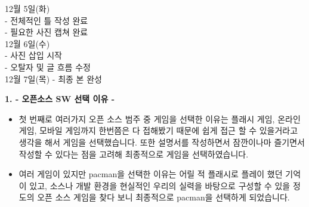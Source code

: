 \documentclass{article}
\begin{document}
12월 5일(화)\\
 
 - 전체적인 틀 작성 완료\\
 
 - 필요한 사진 캡쳐 완료\\
 
12월 6일(수)\\
 
 - 사진 삽입 시작\\
 
 - 오탈자 및 글 흐름 수정\\
 
12월 7일(목)
 - 최종 본 완성\\
 
\flushleft
\begin{large}\textbf{1. - 오픈소스 SW 선택 이유 -}\end{large}
\begin{itemize}
 
\item 첫 번째로 여러가지 오픈 소스 범주 중 게임을 선택한 이유는 플래시 게임, 온라인 게임, 모바일 게임까지 한번쯤은 다 접해봤기 때문에 쉽게 접근 할 수 있을거라고 생각을 해서 게임을 선택했습니다. 또한 설명서를 작성하면서 잠깐이나마 즐기면서 작성할 수 있다는 점을 고려해 최종적으로 게임을 선택하였습니다.\\
 
\item 여러 게임이 있지만 pacman을 선택한 이유는 어릴 적 플래시로 플레이 했던 기억이 있고, 소스나 개발 환경을 현실적인 우리의 실력을 바탕으로 구성할 수 있을 정도의 오픈 소스 게임을 찾다 보니 최종적으로 pacman을 선택하게 되었습니다.
 
\end{itemize}
 
\end{document}
